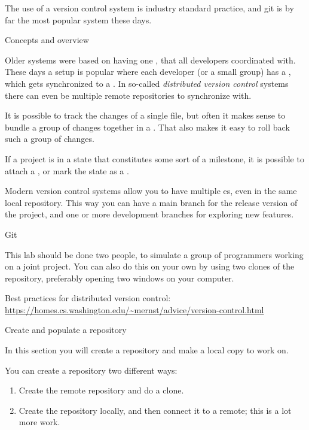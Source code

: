 The use of a version control system is industry standard practice,
and git is by far the most popular system these days.

 {Concepts and overview}

Older systems were based on having one ,
that all developers coordinated with.
These days a setup is popular where each developer (or a small group)
has a ,
which gets synchronized to a .
In so-called \emph{distributed version control}
systems there can even be multiple remote repositories to synchronize with.

It is possible to track the changes of a single file,
but often it makes sense to bundle a group of changes
together in a .
That also makes it easy to roll back such a group of changes.

If a project is in a state that constitutes some sort of a milestone,
it is possible to attach a ,
or mark the state as a .

Modern version control systems allow you to have
multiple es,
even in the same local repository.
This way you can have a main branch for the release version of the project,
and one or more development branches for exploring new features.

 {Git}
\lstset{style=gitsession}

This lab should be done two people, to simulate a group
of programmers working on a joint project. You can also do this on
your own by using two clones of the repository, 
preferably opening two windows on your computer.

Best practices for distributed version control:
\url{https://homes.cs.washington.edu/~mernst/advice/version-control.html}

 {Create and populate a repository}

\begin{purpose}
  In this section you will create a repository and make a local copy
  to work on.
\end{purpose}

You can create a repository two different ways:
\begin{enumerate}
\item Create the remote repository and do a clone.
\item Create the repository locally, and then connect it to a remote;
  this is a lot more work.
\end{enumerate}

